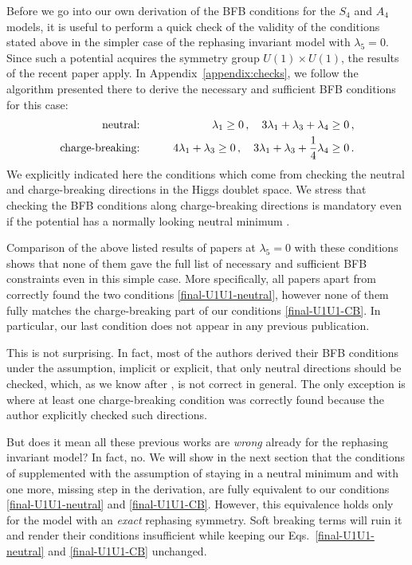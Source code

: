 \documentclass[11pt]{article}
\begin{document}
Before we go into our own derivation of the BFB conditions for the $S_4$ and $A_4$ models,
it is useful to perform a quick check of the validity of the conditions stated above in the simpler case of the rephasing
invariant model with $\lambda_5 = 0$.
Since such a potential acquires the symmetry group $U(1)\times U(1)$, the results of the recent paper \cite{Faro:2019vcd} apply. 
In Appendix~\ref{appendix:checks}, we follow the algorithm presented there to derive the necessary and sufficient BFB conditions for this case: 
\begin{eqnarray}
\mbox{neutral:}&\qquad& \lambda_1 \ge 0\,, \quad
3\lambda_1 + \lambda_3 + \lambda_4 \ge 0\,, \label{final-U1U1-neutral}\\
\mbox{charge-breaking:}&\qquad& 4\lambda_1 + \lambda_3 \ge 0\,, \quad
3\lambda_1 + \lambda_3 + {1\over 4}\lambda_4 \ge 0\,.\label{final-U1U1-CB}
\end{eqnarray}
We explicitly indicated here the conditions which come from checking the neutral and charge-breaking directions in the Higgs doublet space.
We stress that checking the BFB conditions along charge-breaking directions is mandatory even if the potential
has a normally looking neutral minimum \cite{Faro:2019vcd}.

Comparison of the above listed results of papers 
\cite{Toorop:2010ex,Pramanick:2017wry,Chakrabarty:2018yoy,Dekens:2011,Boucenna:2011tj} at $\lambda_5 = 0$ with these conditions shows that none of them gave the full list of necessary and sufficient BFB constraints even in this simple case.
More specifically, all papers apart from \cite{Toorop:2010ex} correctly found the two conditions \eqref{final-U1U1-neutral},
however none of them fully matches the charge-breaking part of our conditions \eqref{final-U1U1-CB}.
In particular, our last condition does not appear in any previous publication.

This is not surprising. In fact, most of the authors derived their BFB conditions under the assumption, implicit or explicit,
that only neutral directions should be checked, which, as we know after \cite{Faro:2019vcd}, is not correct in general.
The only exception is \cite{Dekens:2011} where at least one charge-breaking condition was correctly found
because the author explicitly checked such directions.

But does it mean all these previous works are {\em wrong} already for the rephasing invariant model?
In fact, no. We will show in the next section that the conditions of \cite{Dekens:2011,Pramanick:2017wry}
supplemented with the assumption of staying in a neutral minimum and with one more, missing step in the derivation,
are fully equivalent to our conditions \eqref{final-U1U1-neutral} and \eqref{final-U1U1-CB}. 
However, this equivalence holds only for the model with an {\em exact} rephasing symmetry.
Soft breaking terms will ruin it and render their conditions insufficient 
while keeping our Eqs.~\eqref{final-U1U1-neutral} and \eqref{final-U1U1-CB} unchanged.
\end{document}
